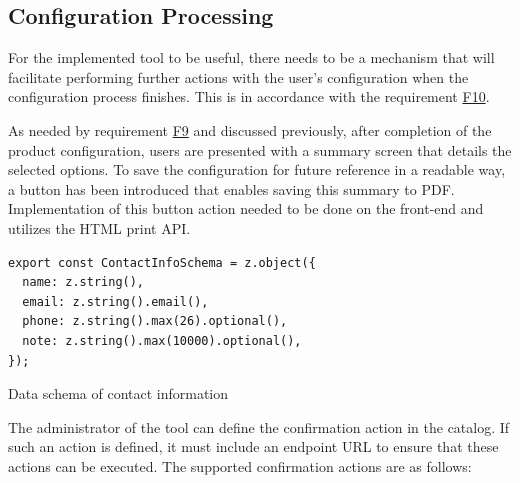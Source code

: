 \subsection{Configuration Processing}

For the implemented tool to be useful, there needs to be a mechanism that will facilitate performing further actions with the user's configuration when the configuration process finishes. This is in accordance with the requirement \hyperref[itm:F10]{F10}.

As needed by requirement \hyperref[itm:F9]{F9} and discussed previously, after completion of the product configuration, users are presented with a summary screen that details the selected options. To save the configuration for future reference in a readable way, a button has been introduced that enables saving this summary to PDF. Implementation of this button action needed to be done on the front-end and utilizes the HTML print API.

\begin{listing}[h]
\begin{verbatim}
export const ContactInfoSchema = z.object({
  name: z.string(),
  email: z.string().email(),
  phone: z.string().max(26).optional(),
  note: z.string().max(10000).optional(),
});
\end{verbatim}
\caption{Data schema of contact information}
\label{listing:schema-contactinformation}
\end{listing}

The administrator of the tool can define the confirmation action in the catalog. If such an action is defined, it must include an endpoint URL to ensure that these actions can be executed. The supported confirmation actions are as follows:

